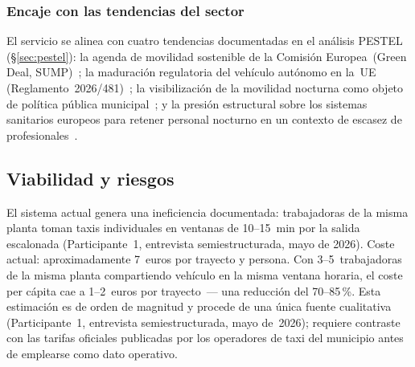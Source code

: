\subsubsection{Encaje con las tendencias del sector}

El servicio se alinea con cuatro tendencias documentadas en
el análisis \acs{PESTEL} (§\ref{sec:pestel}): la agenda de
movilidad sostenible de la Comisión Europea~(Green Deal,
\acs{SUMP})~\parencite{CE_Movilidad2020}; la maduración
regulatoria del vehículo autónomo en la~\acs{UE}
(Reglamento~2026/481)~\parencite{RegUE20262026481}; la
visibilización de la movilidad nocturna como objeto de
política pública municipal~\parencite{URBACTNight2024}; y
la presión estructural sobre los sistemas sanitarios europeos
para retener personal nocturno en un contexto de escasez
de profesionales~\parencite{Eurofound2020Sectors}.

\subsection{Viabilidad y riesgos}
\label{sec:viabilidad}
El sistema actual genera una ineficiencia documentada: trabajadoras
de la misma planta toman taxis individuales en ventanas de 10--15~min
por la salida escalonada (Participante~1, entrevista semiestructurada,
mayo de 2026). Coste actual: aproximadamente 7~euros por trayecto y
persona. Con 3--5~trabajadoras de la misma planta compartiendo vehículo
en la misma ventana horaria, el coste per cápita cae a 1--2~euros por
trayecto~--- una reducción del 70--85\,\%.
Esta estimación es de orden de magnitud y procede de una única fuente
cualitativa (Participante~1, entrevista semiestructurada, mayo de~2026);
requiere contraste con las tarifas oficiales publicadas por los
operadores de taxi del municipio antes de emplearse como dato operativo.

\begin{pendiente}
\end{pendiente}
